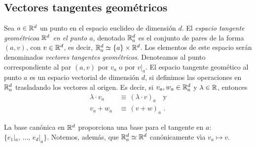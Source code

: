 \theoremstyle{plain}
\newtheorem{propoElDiferencial}{Proposici\'{o}n}[section]
\newtheorem{lemaDerivacionesSonLocales}[propoElDiferencial]{Lema}
\newtheorem{propoDerivacionesIsomorfasI}[propoElDiferencial]{Proposici\'{o}n}
\newtheorem{propoDerivacionesIsomorfasII}[propoElDiferencial]{Proposici\'{o}n}

\theoremstyle{remark}
\newtheorem{obsDerivaciones}{Observaci\'{o}n}[section]
\newtheorem{obsSobreDerivaciones}[obsDerivaciones]{Observaci\'{o}n}
\newtheorem{obsDerivacionesLocalGlobal}[obsDerivaciones]{Observaci\'{o}n}
\newtheorem{obsDerivacionesIsomorfas}[obsDerivaciones]{Observaci\'{o}n}


\subsection{Vectores tangentes geom\'{e}tricos}
Sea $a\in\mathbb{R}^{d}$ un punto en el espacio euclideo de dimensi\'{o}n $d$.
El \emph{espacio tangente geom\'{e}tricoa $\mathbb{R}^{d}$ en el punto $a$},
denotado $\mathbb{R}^{d}_{a}$ es el conjunto de pares de la forma $(a,v)$,
con $v\in\mathbb{R}^{d}$, es decir, $\mathbb{R}^{d}_{a}\simeq\{a\}\times\mathbb{R}^{d}$.
Los elementos de este espacio ser\'{a}n denominados \emph{vectores tangentes %
geom\'{e}tricos}. Denoteamos al punto correspondiente al par $(a,v)$
por $v_{a}$ o por $v|_{a}$. El espacio tangente geom\'{e}tico al punto $a$
es un espacio vectorial de dimensi\'{o}n $d$, si definimos las operaciones
en $\mathbb{R}^{d}_{a}$ trasladando los vectores al origen. Es decir, si
$v_{a},w_{a}\in\mathbb{R}^{d}_{a}$ y $\lambda\in\mathbb{R}$, entonces
\begin{align*}
	\lambda\cdot v_{a} & \,\equiv\,(\lambda\cdot v)_{a}
	\quad\text{y} \\
	v_{a} + w_{a} & \,\equiv\,(v+w)_{a}
	\text{ .}
\end{align*}
%

La base can\'{o}nica en $\mathbb{R}^{d}$ proporciona una base para el tangente
en $a$: $\{e_{1}|_{a},\,\dots,\,e_{d}|_{a}\}$. Notemos, adem\'{a}s, que
$\mathbb{R}^{d}_{a}\simeq\mathbb{R}^{d}$ can\'{o}nicamente v\'{\i}a $v_{a}\mapsto v$.


